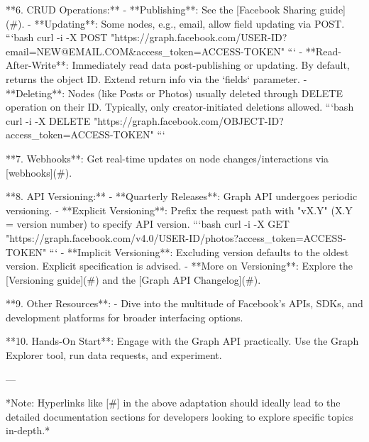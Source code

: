 **6. CRUD Operations:**
- **Publishing**: See the [Facebook Sharing guide](#).
- **Updating**: Some nodes, e.g., email, allow field updating via POST.
  ```bash
  curl -i -X POST "https://graph.facebook.com/USER-ID?email=NEW@EMAIL.COM&access_token=ACCESS-TOKEN"
  ```
- **Read-After-Write**: Immediately read data post-publishing or updating. By default, returns the object ID. Extend return info via the `fields` parameter.
- **Deleting**: Nodes (like Posts or Photos) usually deleted through DELETE operation on their ID. Typically, only creator-initiated deletions allowed. 
  ```bash
  curl -i -X DELETE "https://graph.facebook.com/OBJECT-ID?access_token=ACCESS-TOKEN"
  ```

**7. Webhooks**: Get real-time updates on node changes/interactions via [webhooks](#).

**8. API Versioning:**
- **Quarterly Releases**: Graph API undergoes periodic versioning.
- **Explicit Versioning**: Prefix the request path with "vX.Y" (X.Y = version number) to specify API version.
  ```bash
  curl -i -X GET "https://graph.facebook.com/v4.0/USER-ID/photos?access_token=ACCESS-TOKEN"
  ```
- **Implicit Versioning**: Excluding version defaults to the oldest version. Explicit specification is advised.
- **More on Versioning**: Explore the [Versioning guide](#) and the [Graph API Changelog](#).

**9. Other Resources**:
- Dive into the multitude of Facebook's APIs, SDKs, and development platforms for broader interfacing options.

**10. Hands-On Start**:  
Engage with the Graph API practically. Use the Graph Explorer tool, run data requests, and experiment.

---

*Note: Hyperlinks like [#] in the above adaptation should ideally lead to the detailed documentation sections for developers looking to explore specific topics in-depth.*